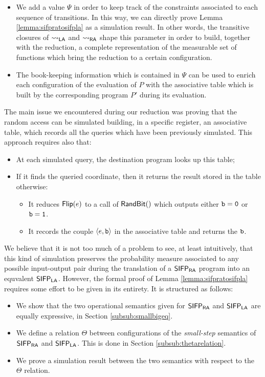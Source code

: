 \begin{itemize}
  \item We add a value $\Psi$ in order to keep track of the constraints
  associated to each sequence of transitions.
  In this way, we can directly prove Lemma \ref{lemma:sifpratosifpla}
  as a simulation result. In other words,
  the transitive closures of ${\leadsto_{\mathsf{LA}}}$ and ${\leadsto_{\mathsf{RA}}}$ shape this parameter in order
  to build, together with the reduction, a complete representation of
  the measurable set of functions which
  bring the reduction to a certain configuration.
  \item The book-keeping information which is contained in $\Psi$ can be used to enrich each
  configuration of the evaluation of $P$ with the associative table
  which is built by the corresponding program $P'$ during its evaluation.
\end{itemize}


%
\noindent
The main issue we encountered during our reduction was proving that the random
access can be simulated building, in
a specific register, an associative table,
which records all the queries which have been previously
simulated. This approach requires also that:
\begin{itemize}
  \item At each simulated query,
  the destination program looks up this table;
  \item If it finds the queried coordinate, then it returns the result stored in the table
  otherwise:
  \begin{itemize}
    \item It reduces $\mathsf{Flip(}e\mathsf{)}$ to a call of $\mathsf{RandBit()}$ which outputs either $\mathtt{b}=\mathtt{0}$ or
    $\mathtt{b}=\mathtt{1}$.
    \item It records the couple $\langle e,\mathtt{b}\rangle$ in
   the associative table and returns the $\mathtt{b}$.
  \end{itemize}
\end{itemize}

We believe that it is not too much of a problem to see, at least intuitively,
that  this kind of simulation preserves the probability measure
associated to any possible input-output pair during the translation of a $\mathsf{SIFP_{{\mathsf{RA}}}}$
program into an equvalent $\mathsf{SIFP_{{\mathsf{LA}}}}$. However,
the formal proof of Lemma \ref{lemma:sifpratosifpla}
requires some effort to be given
in its entirety. It is structured as follows:

\begin{itemize}
  \item We show that the two operational semantics given for $\mathsf{SIFP_{{\mathsf{RA}}}}$ and $\mathsf{SIFP_{{\mathsf{LA}}}}$
  are equally expressive, in Section \ref{subsub:smallbigeq}.%
  \item We define a relation $\Theta$ between configurations of the \emph{small-step}
  semantics of $\mathsf{SIFP_{{\mathsf{RA}}}}$ and $\mathsf{SIFP_{{\mathsf{LA}}}}$. This is done in Section \ref{subsub:thetarelation}.
  \item We prove a simulation result between the two semantics with respect to the $\Theta$ relation.
\end{itemize}

